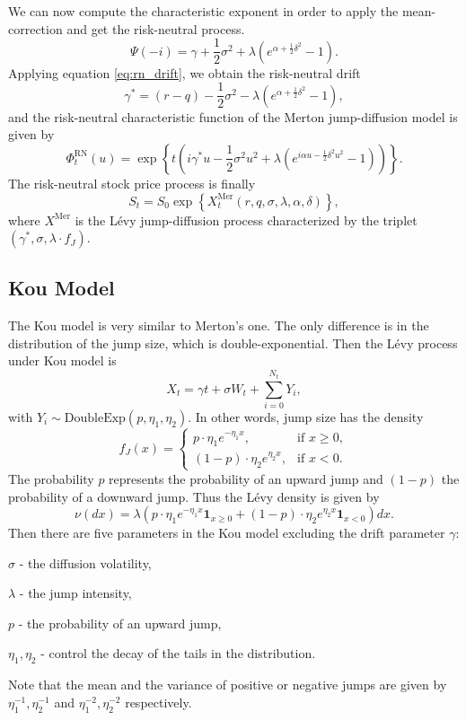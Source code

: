 We can now compute the characteristic exponent in order to apply the mean-correction and get the risk-neutral process.
$$\Psi(-i) = \gamma +\frac{1}{2}\sigma^2 + \lambda\left(e^{\alpha+\frac{1}{2}\delta^2}-1\right).$$
Applying equation \eqref{eq:rn_drift}, we obtain the risk-neutral drift
$$\gamma^\ast = (r-q) -\frac{1}{2}\sigma^2 - \lambda\left(e^{\alpha+\frac{1}{2}\delta^2}-1\right),$$
and the risk-neutral characteristic function of the Merton jump-diffusion model is given by
$$\Phi_t^{\text{RN}}(u) = \exp\left\{t\left(i\gamma^\ast u -\frac{1}{2}\sigma^2 u^2 + \lambda\left(e^{i\alpha u -\frac{1}{2}\delta^2 u^2}-1\right)\right)\right\}.$$
The risk-neutral stock price process is finally
$$S_t = S_0\exp\left\{X_t^\text{Mer}(r,q,\sigma,\lambda,\alpha,\delta)\right\},$$
where $X^\text{Mer}$ is the L\'evy jump-diffusion process characterized by the triplet $(\gamma^\ast,\sigma,\lambda\cdot f_J)$.

\subsection{Kou Model}
The Kou model \citeyearpar{Kou02} is very similar to Merton's one. The only difference is in the distribution of the jump size, which is double-exponential. Then the L\'evy process under Kou model is
$$X_t = \gamma t +\sigma W_t +\sum_{i=0}^{N_t} Y_i,$$
with $Y_i\sim \text{DoubleExp}(p,\eta_1,\eta_2)$. In other words, jump size has the density
$$f_J(x) = \begin{cases}
p\cdot\eta_1e^{-\eta_1 x}, &\text{if } x \geq 0,\\
(1-p)\cdot\eta_2e^{\eta_2x}, &\text{if } x <0.
\end{cases}$$
The probability $p$ represents the probability of an upward jump and $(1-p)$ the probability of a downward jump. Thus the L\'evy density is given by
$$\nu(dx) = \lambda\left(p\cdot\eta_1e^{-\eta_1 x} \mathbf{1}_{x\geq0}+(1-p)\cdot\eta_2e^{\eta_2x}\mathbf{1}_{x<0}\right)dx.$$
Then there are five parameters in the Kou model excluding the drift parameter $\gamma$:
\begin{my_list_item}
\item $\sigma$ - the diffusion volatility, 
\item $\lambda$ - the jump intensity,
\item $p$ - the probability of an upward jump,
\item $\eta_1, \eta_2$ - control the decay of the tails in the distribution.
\end{my_list_item}
Note that the mean and the variance of positive or negative jumps are given by $\eta_1^{-1},\eta_2^{-1}$ and $\eta_1^{-2},\eta_2^{-2}$ respectively.

